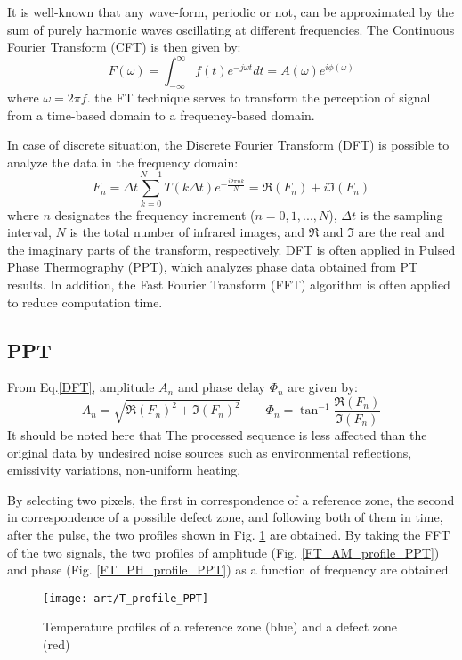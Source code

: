 It is well-known that any wave-form, periodic or not, can be approximated by the sum of purely harmonic waves oscillating at different frequencies. The Continuous Fourier Transform (CFT) is then given by:
\begin{equation}
F(\omega) = \int_{-\infty}^{\infty}f(t)e^{-j\omega t}dt = A(\omega)e^{i\phi(\omega)}
\end{equation}
where $\omega = 2 \pi f$. the FT technique serves to transform the perception of signal from a time-based domain to a frequency-based domain.

In case of discrete situation, the Discrete Fourier Transform (DFT) is possible to analyze the data in the frequency domain:
\begin{equation}
F_n = \Delta t \sum_{k=0}^{N-1}T(k\Delta t)e^{-\tfrac{i2\pi nk}{N}} = \Re(F_n) + i\Im(F_n)
\label{DFT}
\end{equation}
where $n$ designates the frequency increment ($n=0, 1, ..., N$), $\Delta t$ is the sampling interval, $N$ is the total number of infrared images, and $\Re$ and $\Im$ are the real and the imaginary parts of the transform, respectively.
DFT is often applied in Pulsed Phase Thermography (PPT), which analyzes phase data obtained from PT results. In addition, the Fast Fourier Transform (FFT) algorithm is often applied to reduce computation time.

\subsection{PPT}
From Eq.\ref{DFT}, amplitude $A_n$ and phase delay $\Phi_n$ are given by:
\begin{equation}
A_n = \sqrt{\Re(F_n)^2 + \Im(F_n)^2} \qquad \Phi_n = \tan^{-1}\frac{\Re(F_n)}{\Im(F_n)}
\end{equation}
It should be noted here that The processed sequence is less affected than the original data by undesired noise
sources such as environmental reflections, emissivity variations, non-uniform heating.

By selecting two pixels, the first in correspondence of a reference zone, the second in correspondence of a possible defect zone, and following both of them in time, after the pulse, the two profiles shown in Fig. \ref{T_profile_PPT} are obtained. By taking the FFT of the two signals, the two profiles of amplitude (Fig. \ref{FT_AM_profile_PPT}) and phase (Fig. \ref{FT_PH_profile_PPT})
as a function of frequency are obtained.
\begin{figure}[!h]
	\centering
	\texttt{[image: art/T\_profile\_PPT]}
	\caption{Temperature profiles of a reference zone (blue) and a defect zone (red)}
	\label{T_profile_PPT}
\end{figure}

